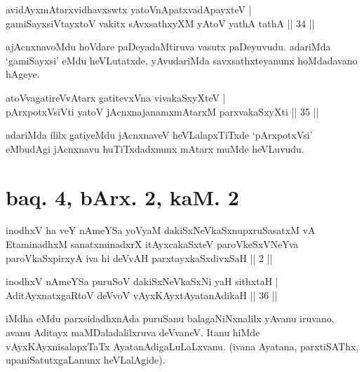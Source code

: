 
\begin{shl}
avidAyxmAtarxvidhavxswtx yatoV\s nApatxvadApayxteV |\\
gamiSayxsiVtayxtoV vakitx sAvxsathxyXM yAtoV yathA tathA \hfill || 34 || 
\end{shl}

\begin{artha}
ajAcnxnavoMdu hoVdare paDeyadaMtiruva vasutx paDeyuvudu. adariMda `gamiSayxsi' eMdu heVLutatxde, yAvudariMda savxsathxteyanunx hoMdadavano hAgeye.
\end{artha}

\begin{shl}
atoV\s vagatireVvAtarx gatitevxVna vivakaSxyXteV |\\
pArxpotxV\s siVti yatoV jAcnxnajanamxmAtarxM parxvakaSxyXti \hfill || 35 || 
\end{shl}

\begin{artha}
adariMda ililx gatiyeMdu jAcnxnaveV heVLalapxTiTxde `pArxpotxVsi' eMbudAgi jAcnxnavu huTiTxdadxnunx mAtarx muMde heVLuvudu.
\end{artha}


\section*{baq. 4, bArx. 2, kaM. 2}

\begin{shl}
inodhxV ha veY nAmeYSa yoV\s yaM dakiSxNeV\s kaSxnupxruSasatxM vA EtaminadhxM sanatxminadxrX itAyxcakaSxteV paroVkeSxVNeYva paroVkaSxpirxyA iva hi deVvAH parxtayxkaSxdivxSaH || 2 ||
\end{shl}


\begin{shl}
inodhxV nAmeYSa puruSoV dakiSxNeV\s kaSxNi yaH sithxtaH |\\
AditAyxnatxgaRtoV deVvoV vAyxKAyxtAyatanAdikaH \hfill || 36 || 
\end{shl}

\begin{artha}
iMdha eMdu parxsidadhxnAda puruSanu balagaNiNxnalilx yAvanu iruvano, avanu Aditayx maMDaladalilxruva deVvaneV. Itanu hiMde vAyxKAyxnisalapxTaTx AyatanAdigaLuLaLxvanu. (ivana Ayatana, parxtiSAThx, upaniSatutxgaLanunx heVLalAgide).
\end{artha}

